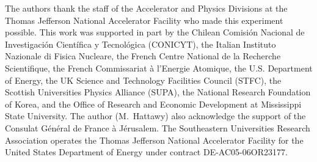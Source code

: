\documentclass[twocolumn,nofootinbib,showpacs,prl,superscriptaddress,secnumarabic,amssymb,nobibnotes,aps,floatfix]{revtex4}
\begin{document}
The authors thank the staff of the Accelerator and Physics Divisions at the 
Thomas Jefferson National Accelerator Facility who made this experiment 
possible. This work was supported in part by the Chilean Comisi\'on Nacional 
de Investigaci\'on Cient\'ifica y Tecnol\'ogica (CONICYT), the Italian 
Instituto Nazionale di Fisica Nucleare, the French Centre National de la 
Recherche Scientifique, the French Commissariat \`a l'Energie Atomique, the 
U.S. Department of Energy, the UK Science and Technology Facilities Council 
(STFC), the Scottish Universities Physics Alliance (SUPA), the National 
Research Foundation of Korea, and the Office of Research and Economic 
Development at Mississippi State University.  The author (M.~Hattawy) also 
acknowledge the support of the Consulat G\'en\'eral de France \`a J\'erusalem. 
The Southeastern Universities Research Association operates the Thomas 
Jefferson National Accelerator Facility for the United States Department of 
Energy under contract DE-AC05-06OR23177.
\end{document}
